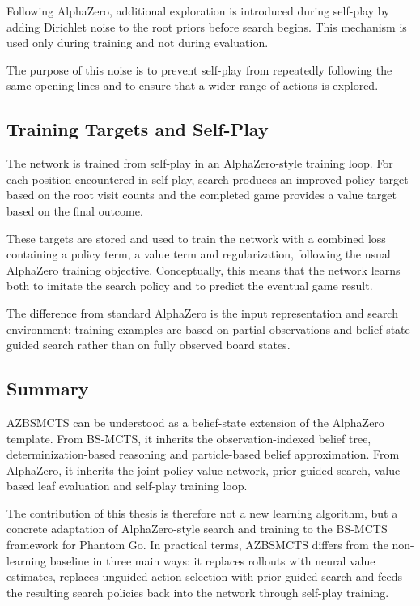 \documentclass[12pt,oneside,openright]{article}
\begin{document}
Following AlphaZero, additional exploration is introduced during self-play by adding
Dirichlet noise to the root priors before search begins.
This mechanism is used only during training and not during evaluation.~\cite{Silver2017alphazero}

The purpose of this noise is to prevent self-play from repeatedly following the same
opening lines and to ensure that a wider range of actions is explored.

\subsection{Training Targets and Self-Play}

The network is trained from self-play in an AlphaZero-style training loop.
For each position encountered in self-play, search produces an improved policy target
based on the root visit counts and the completed game provides a value target based
on the final outcome.

These targets are stored and used to train the network with a combined loss containing
a policy term, a value term and regularization, following the usual AlphaZero training
objective. Conceptually, this means that the network learns both to imitate the search
policy and to predict the eventual game result.

The difference from standard AlphaZero is the input representation and search
environment: training examples are based on partial observations and belief-state-guided
search rather than on fully observed board states.

\subsection{Summary}

AZBSMCTS can be understood as a belief-state extension of the AlphaZero template.
From BS-MCTS, it inherits the observation-indexed belief tree, determinization-based
reasoning and particle-based belief approximation. From
AlphaZero, it inherits the joint policy-value network, prior-guided search, value-based
leaf evaluation and self-play training loop.

The contribution of this thesis is therefore not a new learning algorithm, but a concrete
adaptation of AlphaZero-style search and training to the BS-MCTS framework for
Phantom Go. In practical terms, AZBSMCTS differs from the non-learning baseline in
three main ways: it replaces rollouts with neural value estimates, replaces unguided
action selection with prior-guided search and feeds the resulting search policies back
into the network through self-play training.
\end{document}
